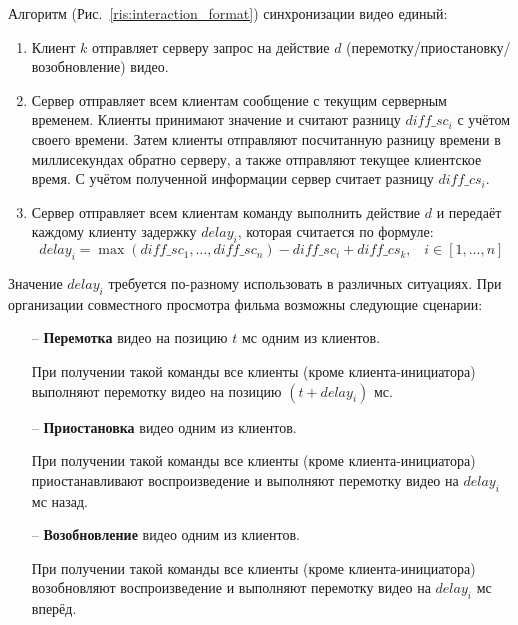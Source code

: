 Алгоритм (Рис.~\ref{ris:interaction_format}) синхронизации видео единый:
\begin{enumerate}
    \item Клиент \(k\) отправляет серверу запрос на действие \(d\) (перемотку/приостановку/возобновление) видео.
    \item Сервер отправляет всем клиентам сообщение с текущим серверным временем.
    Клиенты принимают значение и считают разницу \(diff\_sc_i\) с учётом своего времени.
    Затем клиенты отправляют посчитанную разницу времени в миллисекундах обратно серверу, а также отправляют текущее клиентское время.
    С учётом полученной информации сервер считает разницу \(diff\_cs_i\).
    \item Сервер отправляет всем клиентам команду выполнить действие \(d\) и передаёт каждому клиенту задержку \(delay_i\),
    которая считается по формуле: \[ delay_i = \max(diff\_sc_1, \ldots, diff\_sc_n) - diff\_sc_i + diff\_cs_k, \;\;\; i \in [1, \ldots, n] \]
\end{enumerate}

Значение \(delay_i\) требуется по-разному использовать в различных ситуациях.
При организации совместного просмотра фильма возможны следующие сценарии:
\begin{itemize}
    \item[--] \textbf{Перемотка} видео на позицию \(t\) мс одним из клиентов.

    При получении такой команды все клиенты (кроме клиента-инициатора) выполняют перемотку видео на позицию \((t + delay_i)\) мс.
    \item[--] \textbf{Приостановка} видео одним из клиентов.

    При получении такой команды все клиенты (кроме клиента-инициатора) приостанавливают воспроизведение и выполняют перемотку видео на \(delay_i\) мс назад.
    \item[--] \textbf{Возобновление} видео одним из клиентов.

    При получении такой команды все клиенты (кроме клиента-инициатора) возобновляют воспроизведение и выполняют перемотку видео на \(delay_i\) мс вперёд.
\end{itemize}

